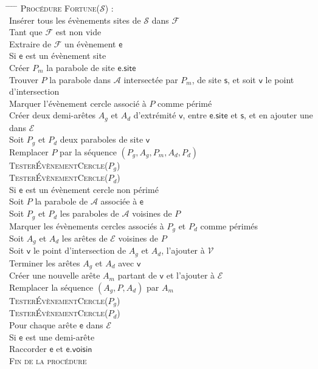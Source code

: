 \documentclass[a4paper, 10pt]{article}
\begin{document}
\begin{tabbing}
\hspace{0.5cm} \= \hspace{0.5cm} \= \hspace{0.5cm} \= \hspace{0.5cm} \= \kill
\textsc{Procédure Fortune($\mathcal{S}$) :} \\  
\> Insérer tous les évènements sites de $\mathcal{S}$ dans $\mathcal{F}$ \\
\> Tant que $\mathcal{F}$ est non vide \\  
\> \> Extraire de $\mathcal{F}$ un évènement $\mathsf{e}$ \\ 
\> \> Si $\mathsf{e}$ est un évènement site \\
\> \> \> Créer $P_m$ la parabole de site $\mathsf{e.site}$\\
\> \> \> Trouver $P$ la parabole dans $\mathcal{A}$ intersectée par $P_m$, de site $\mathsf{s}$, et soit $\mathsf{v}$ le point d'intersection \\
\> \> \> Marquer l'évènement cercle associé à $P$ comme périmé \\  
\> \> \> Créer deux demi-arêtes $A_g$ et $A_d$ d'extrémité $\mathsf{v}$, entre $\mathsf{e}.\mathsf{site}$ et $\mathsf{s}$, et en ajouter une dans $\mathcal{E}$ \\
\> \> \> Soit $P_g$ et $P_d$ deux paraboles de site $\mathsf{v}$ \\  
\> \> \> Remplacer $P$ par la séquence $(P_g, A_g, P_m, A_d, P_d)$ \\
\> \> \> \textsc{TesterÉvènementCercle}($P_g$) \\
\> \> \> \textsc{TesterÉvènementCercle}($P_d$) \\
\> \> Si $\mathsf{e}$ est un évènement cercle non périmé \\
\> \> \> Soit $P$ la parabole de $\mathcal{A}$ associée à $\mathsf{e}$ \\
\> \> \> Soit $P_g$ et $P_d$ les paraboles de $\mathcal{A}$ voisines de $P$ \\
\> \> \> Marquer les évènements cercles associés à $P_g$ et $P_d$ comme périmés \\
\> \> \> Soit $A_g$ et $A_d$ les arêtes de $\mathcal{E}$ voisines de $P$ \\
\> \> \> Soit $\mathsf{v}$ le point d'intersection de $A_g$ et $A_d$, l'ajouter à $\mathcal{V}$ \\  
\> \> \> Terminer les arêtes $A_g$ et $A_d$ avec $\mathsf{v}$ \\
\> \> \> Créer une nouvelle arête $A_m$ partant de $\mathsf{v}$ et l'ajouter à $\mathcal{E}$\\  
\> \> \> Remplacer la séquence $(A_g, P, A_d)$ par $A_m$ \\  
\> \> \> \textsc{TesterÉvènementCercle}($P_g$) \\
\> \> \> \textsc{TesterÉvènementCercle}($P_d$) \\
\> Pour chaque arête $\mathsf{e}$ dans $\mathcal{E}$ \\
\> \> Si $\mathsf{e}$ est une demi-arête \\  
\> \> \> Raccorder $\mathsf{e}$ et $\mathsf{e.voisin}$ \\
\textsc{Fin de la procédure}
\end{tabbing} 
\end{document}
